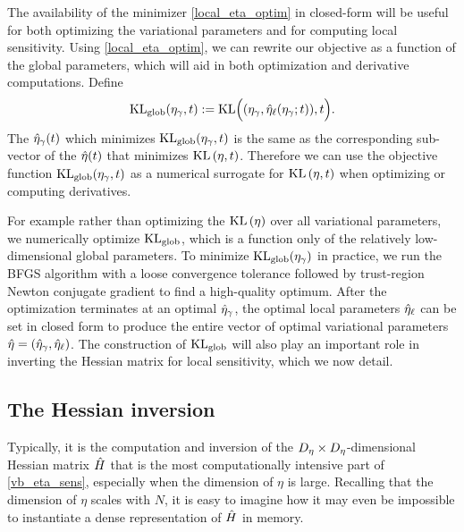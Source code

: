 The availability of the minimizer \eqref{local_eta_optim} in closed-form will be
useful for both optimizing the variational parameters and for computing local
sensitivity.  Using \eqref{local_eta_optim}, we can rewrite our objective as a
function of the global parameters, which will aid in both optimization and
derivative computations.  Define
%
\begin{align*}
\KLglobal(\etaglob, \t) :=
    \mathrm{KL}\Big((\etaglob, \etaoptlocal(\etaglob; \t)), \t\Big).
\end{align*}
%
The $\hat\eta_{\gamma}(t)$ which minimizes $\mathrm{KL}_{\mathrm{glob}}(\eta_{\gamma}, t)$ is the same as
the corresponding sub-vector of the $\hat\eta(t)$ that minimizes $\mathrm{KL}\left(\eta,
t\right)$.  Therefore we can use the objective function $\mathrm{KL}_{\mathrm{glob}}(\eta_{\gamma}, t)$ as
a numerical surrogate for $\mathrm{KL}\left(\eta, t\right)$ when optimizing or computing
derivatives.

For example rather than optimizing the $\mathrm{KL}\left(\eta\right)$ over all variational
parameters, we numerically optimize $\mathrm{KL}_{\mathrm{glob}}$, which is a function only of the
relatively low-dimensional global parameters.  To minimize $\mathrm{KL}_{\mathrm{glob}}(\eta_{\gamma})$
in practice, we run the BFGS algorithm with a loose convergence tolerance
followed by trust-region Newton conjugate gradient
\citep[Chapter~7]{nocedal:2006:numerical} to find a high-quality optimum. After
the optimization terminates at an optimal $\hat\eta_{\gamma}$, the optimal local
parameters $\hat\eta_{\ell}$ can be set in closed form to produce the entire vector
of optimal variational parameters $\hat\eta = (\hat\eta_{\gamma}, \hat\eta_{\ell})$.
%
The construction of $\mathrm{KL}_{\mathrm{glob}}$ will also play an important role in inverting
the Hessian matrix for local sensitivity, which we now detail.


\subsection{The Hessian inversion}

Typically, it is the computation and inversion of the ${D_{\eta}} \times
{D_{\eta}}$-dimensional Hessian matrix $\hat{H}$ that is the most computationally
intensive part of \eqref{vb_eta_sens}, especially when the dimension of $\eta$
is large.  Recalling that the dimension of $\eta$ scales with $N$, it is easy to
imagine how it may even be impossible to instantiate a dense representation of
$\hat{H}$ in memory.


